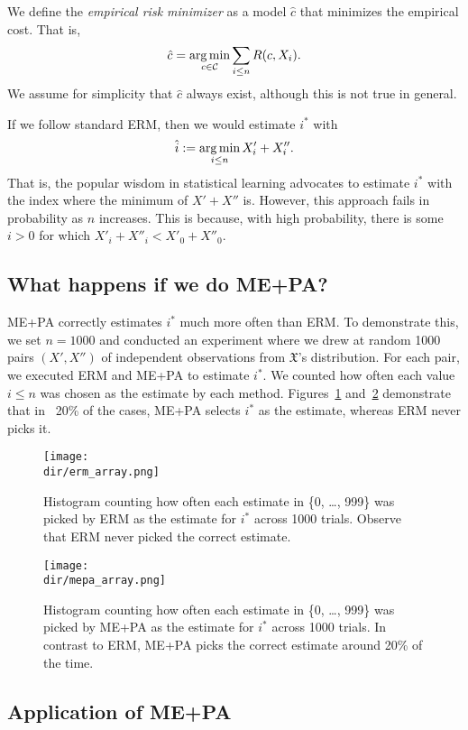 We define the \emph{empirical risk minimizer} as a model $\hat{c}$ that minimizes the empirical cost. That is,
%
\begin{equation}
\hat{c} = \operatorname*{arg\,min}_{c \in \mathcal{C}} \sum_{i \leq n} R(c, X_i).
\end{equation}
%
We assume for simplicity that $\hat{c}$ always exist, although this is not true in general.

If we follow standard ERM, then we would estimate $i^*$ with 
%
$$\hat{i} := \operatorname*{arg\,min}_{i \leq n} X'_i + X''_i.$$ 
%
That is, the popular wisdom in statistical learning advocates to estimate $i^*$ with the index where the minimum of $X' + X''$ is. However, this approach fails in probability as $n$ increases. This is because, with high probability, there is some $i > 0$ for which $X'_i + X''_i < X'_0 + X''_0$.

\subsection{What happens if we do ME+PA?}

ME+PA correctly estimates $i^*$ much more often than ERM. To demonstrate this, we set $n = 1000$ and conducted an experiment where we drew at random 1000 pairs $(X', X'')$ of independent observations from $\mathfrak{X}$'s distribution. For each pair, we executed ERM and ME+PA to estimate $i^*$. We counted how often each value $i \leq n$ was chosen as the estimate by each method. Figures~\ref{fig:erm_array} and~\ref{fig:mepa_array} demonstrate that in ~20\% of the cases, ME+PA selects $i^*$ as the estimate, whereas ERM never picks it.

\begin{figure}
\centering
\texttt{[image: \\dir/erm\_array.png]}
\caption{Histogram counting how often each estimate in \{0, \ldots, 999\} was picked by ERM as the estimate for $i^*$ across 1000 trials. Observe that ERM never picked the correct estimate.}
\label{fig:erm_array}
\end{figure}

\begin{figure}
\centering
\texttt{[image: \\dir/mepa\_array.png]}
\caption{Histogram counting how often each estimate in \{0, \ldots, 999\} was picked by ME+PA as the estimate for $i^*$ across 1000 trials. In contrast to ERM, ME+PA picks the correct estimate around 20\% of the time.}
\label{fig:mepa_array}
\end{figure}

\subsection{Application of ME+PA}

